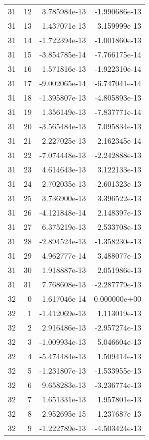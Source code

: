 \begin{tabular}{rrrr}
  31 &   12 &  3.785984e-13 & -1.990686e-13 \\
  31 &   13 & -1.437071e-13 & -3.159999e-13 \\
  31 &   14 & -1.722394e-13 & -1.001860e-13 \\
  31 &   15 & -3.854785e-14 & -7.766175e-14 \\
  31 &   16 &  1.571816e-13 & -1.922310e-14 \\
  31 &   17 & -9.002065e-14 & -6.747041e-14 \\
  31 &   18 & -1.395807e-13 & -4.805893e-13 \\
  31 &   19 &  1.356149e-13 & -7.837771e-14 \\
  31 &   20 & -3.565484e-13 &  7.095834e-13 \\
  31 &   21 & -2.227025e-13 & -2.162345e-14 \\
  31 &   22 & -7.074448e-13 & -2.242888e-13 \\
  31 &   23 &  4.614643e-13 &  3.122133e-13 \\
  31 &   24 &  2.702035e-13 & -2.601323e-13 \\
  31 &   25 &  3.736900e-13 &  3.396522e-13 \\
  31 &   26 & -4.121848e-14 &  2.148397e-13 \\
  31 &   27 &  6.375219e-13 &  2.533708e-13 \\
  31 &   28 & -2.894524e-13 & -1.358230e-13 \\
  31 &   29 &  4.962777e-14 &  3.488077e-13 \\
  31 &   30 &  1.918887e-13 &  2.051986e-13 \\
  31 &   31 &  7.768608e-13 & -2.287779e-13 \\
  32 &    0 &  1.617046e-14 &  0.000000e+00 \\
  32 &    1 & -1.412069e-13 &  1.113019e-13 \\
  32 &    2 &  2.916486e-13 & -2.957274e-13 \\
  32 &    3 & -1.009934e-13 &  5.046604e-13 \\
  32 &    4 & -5.474484e-13 &  1.509414e-13 \\
  32 &    5 & -1.231807e-13 & -1.533955e-13 \\
  32 &    6 &  9.658283e-13 & -3.236774e-13 \\
  32 &    7 &  1.651331e-13 &  1.957801e-13 \\
  32 &    8 & -2.952695e-15 & -1.237687e-13 \\
  32 &    9 & -1.222789e-13 & -4.503424e-13 \\

\end{tabular}
